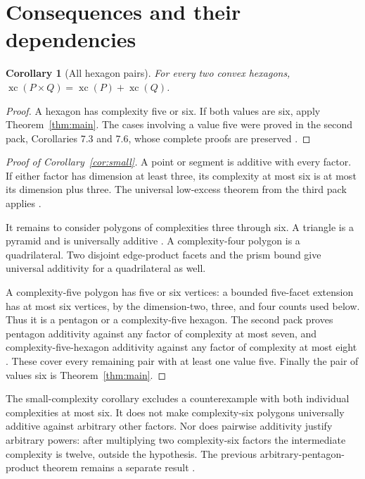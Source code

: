 \documentclass[11pt,a4paper]{article}
\newcommand{\xc}{\operatorname{xc}}
\newtheorem{corollary}[theorem]{Corollary}
\theoremstyle{definition}\newtheorem{definition}[theorem]{Definition}
\theoremstyle{remark}\newtheorem{remark}[theorem]{Remark}
\begin{document}
\section{Consequences and their dependencies}\label{sec:corollaries}
\begin{corollary}[All hexagon pairs]
For every two convex hexagons,
$\xc(P\times Q)=\xc(P)+\xc(Q)$.
\end{corollary}
\begin{proof}
A hexagon has complexity five or six. If both values are six, apply
Theorem~\ref{thm:main}. The cases involving a value five were proved in the
second pack, Corollaries 7.3 and 7.6, whose complete proofs are preserved
\cite{round2}.
\end{proof}

\begin{proof}[Proof of Corollary~\ref{cor:small}]
A point or segment is additive with every factor. If either factor has
dimension at least three, its complexity at most six is at most its dimension
plus three. The universal low-excess theorem from the third pack applies
\cite{round3}.

It remains to consider polygons of complexities three through six. A triangle
is a pyramid and is universally additive \cite{twz}. A complexity-four polygon
is a quadrilateral. Two disjoint edge-product facets and the prism bound give
universal additivity for a quadrilateral as well.

A complexity-five polygon has five or six vertices: a bounded five-facet
extension has at most six vertices, by the dimension-two, three, and four
counts used below. Thus it is a pentagon or a complexity-five hexagon. The
second pack proves pentagon additivity against any factor of complexity at
most seven, and complexity-five-hexagon additivity against any factor of
complexity at most eight \cite{round2}. These cover every remaining pair with
at least one value five. Finally the pair of values six is
Theorem~\ref{thm:main}.
\end{proof}

The small-complexity corollary excludes a counterexample with both individual
complexities at most six. It does not make complexity-six polygons universally
additive against arbitrary other factors. Nor does pairwise additivity justify
arbitrary powers: after multiplying two complexity-six factors the intermediate
complexity is twelve, outside the hypothesis. The previous arbitrary-pentagon-
product theorem remains a separate result \cite{round3}.
\end{document}
